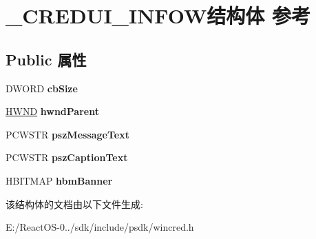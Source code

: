 \hypertarget{struct___c_r_e_d_u_i___i_n_f_o_w}{}\section{\+\_\+\+C\+R\+E\+D\+U\+I\+\_\+\+I\+N\+F\+O\+W结构体 参考}
\label{struct___c_r_e_d_u_i___i_n_f_o_w}
\subsection*{Public 属性}
\begin{DoxyCompactItemize}
\item 
\mbox{\label{struct___c_r_e_d_u_i___i_n_f_o_w_a485efb800329242ce6c1b2b0a2aa5839}} 
D\+W\+O\+RD {\bfseries cb\+Size}
\item 
\mbox{\label{struct___c_r_e_d_u_i___i_n_f_o_w_a3aa8a0d9f9e7e189e896d69d44889cff}} 
\hyperlink{interfacevoid}{H\+W\+ND} {\bfseries hwnd\+Parent}
\item 
\mbox{\label{struct___c_r_e_d_u_i___i_n_f_o_w_a3d0edf227034624f2f8001c237047932}} 
P\+C\+W\+S\+TR {\bfseries psz\+Message\+Text}
\item 
\mbox{\label{struct___c_r_e_d_u_i___i_n_f_o_w_a57f65c8cc5d53b8fd3cb64ee49261cc6}} 
P\+C\+W\+S\+TR {\bfseries psz\+Caption\+Text}
\item 
\mbox{\label{struct___c_r_e_d_u_i___i_n_f_o_w_a6a0ace59b95eeab2ebef6a4b95b03892}} 
H\+B\+I\+T\+M\+AP {\bfseries hbm\+Banner}
\end{DoxyCompactItemize}


该结构体的文档由以下文件生成\+:\begin{DoxyCompactItemize}
\item 
E\+:/\+React\+O\+S-\/0../sdk/include/psdk/wincred.\+h\end{DoxyCompactItemize}
